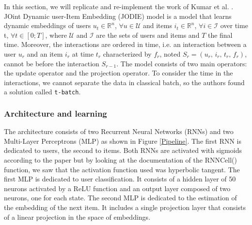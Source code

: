 In this section, we will replicate and re-implement the work of Kumar et al. \supercite{kumar2019predicting}. JOint Dynamic user-Item Embedding (JODIE) model is a model that learns dynamic embeddings of users $u_t \in \mathbb{R}^n$, $\forall u \in \mathcal{U}$ and items $i_t \in \mathbb{R}^n$, $\forall i \in \mathcal{I}$ over time t, $\forall t \in [0; T]$, where $\mathcal{U}$ and $\mathcal{I}$ are the sets of users and items and $T$ the final time. Moreover, the interactions are ordered in time, i.e. an interaction between a user $u_r$ and an item $i_r$ at time $t_r$ characterized by $f_r$, noted $S_r = (u_r, \, i_r, \, t_r, \, f_r)$, cannot be before the interaction $S_{r-1}$. The model consists of two main operators: the update operator and the projection operator. To consider the time in the interactions, we cannot separate the data in classical batch, so the authors found a solution called \texttt{t-batch}.

\subsubsection{Architecture and learning}

The architecture consists of two Recurrent Neural Networks (RNNs) and two Multi-Layer Perceptrons (MLP) as shown in Figure \ref{Pipeline}. The first RNN is dedicated to users, the second to items. Both RNNs are activated with sigmoids according to the paper but by looking at the documentation of the RNNCell() function, we saw that the activation function used was hyperbolic tangent. The first MLP is dedicated to user classification. It consists of a hidden layer of 50 neurons activated by a ReLU function and an output layer composed of two neurons, one for each state. The second MLP is dedicated to the estimation of the embedding of the next item. It includes a single projection layer that consists of a linear projection in the space of embeddings.

